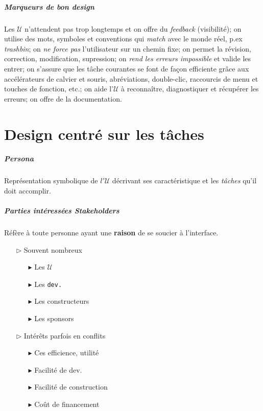 \documentclass{report}
\begin{document}
\begin{multicols*}{3}
    \paragraph{Marqueurs de bon design}
    Les $\mathcal{U}$ n'attendent pas trop longtemps et on offre 
    du \textit{feedback} (visibilité); on utilise des mots, symboles
    et conventions
    qui \textit{match} avec le monde réel, p.ex \textit{trashbin}; 
    on \textit{ne force pas} l'utilisateur sur un chemin fixe; 
    on permet la révision, correction, modification, supression; 
    on \textit{rend les erreurs impossible} et valide les entrer; 
    on s'assure 
    que les tâche courantes se font de façon efficiente grâce aux 
    accélérateurs de calvier et souris, abréviations, double-clic,
    raccourcis 
    de menu et touches de fonction, etc.; on aide  
    l'$\mathcal{U}$ à reconnaître, diagnostiquer et récupérer 
    les erreurs; on offre de la documentation.


    \chapter{Design centré sur les tâches}

    \paragraph{Persona}
    Représentation symbolique de $l'\mathcal{U}$ décrivant 
    ses caractéristique et les \textit{tâches} qu'il doit 
    accomplir. 

     \paragraph{Parties intéressées \textit{Stakeholders}  }
     Réfère à toute personne ayant une 
     \textbf{raison} de se soucier à l'interface.   
     \begin{itemize}
       \item [$\rhd$ ] Souvent nombreux 
         \begin{itemize}
           \item [$\blacktriangleright $] Les $\mathcal{U}$ 
           \item [$\blacktriangleright $] Les \texttt{dev.}  
           \item [$\blacktriangleright $] Les constructeurs 
           \item [$\blacktriangleright $] Les sponsors 
         \end{itemize}
       \item [$\rhd$ ] Intérêts parfois en conflits
         \begin{itemize}
           \item [$\blacktriangleright $] Ces efficience, utilité 
           \item [$\blacktriangleright $] Facilité de dev. 
           \item [$\blacktriangleright $] Facilité de construction 
           \item [$\blacktriangleright $] Coût de financement 
         \end{itemize}
     \end{itemize}
     \noindent

\end{multicols*}
\end{document}
